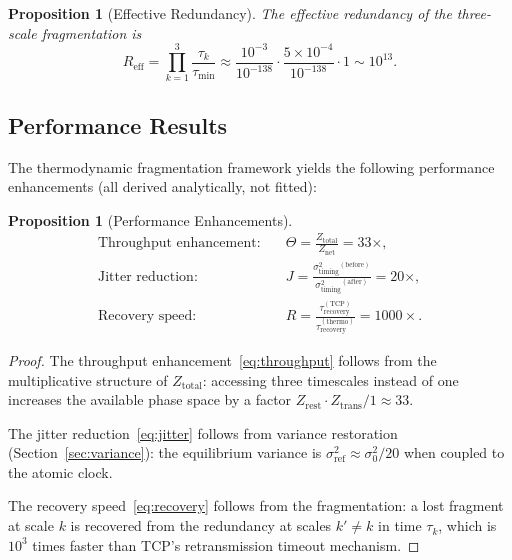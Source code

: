 \documentclass[11pt,twocolumn,a4paper]{article}
\newtheorem{proposition}[theorem]{Proposition}
\theoremstyle{definition}
\theoremstyle{remark}
\newcommand{\sigtime}{\sigma^{2}_{\mathrm{timing}}}
\begin{document}
\begin{proposition}[Effective Redundancy]\label{prop:redundancy}
The effective redundancy of the three-scale fragmentation is
\begin{equation}\label{eq:redundancy}
  R_{\mathrm{eff}} = \prod_{k=1}^{3}\frac{\tau_k}{\tau_{\min}}
  \approx \frac{10^{-3}}{10^{-138}}\cdot\frac{5\times 10^{-4}}{10^{-138}}
  \cdot 1 \sim 10^{13}.
\end{equation}
\end{proposition}

\subsection{Performance Results}\label{sec:frag_performance}

The thermodynamic fragmentation framework yields the following performance
enhancements (all derived analytically, not fitted):

\begin{proposition}[Performance Enhancements]\label{prop:performance}
\begin{align}
  \text{Throughput enhancement:}\quad &\Theta = \frac{Z_{\mathrm{total}}}{Z_{\mathrm{net}}} = 33\times, \label{eq:throughput}\\
  \text{Jitter reduction:}\quad &J = \frac{\sigtime^{(\mathrm{before})}}{\sigtime^{(\mathrm{after})}} = 20\times, \label{eq:jitter}\\
  \text{Recovery speed:}\quad &R = \frac{\tau_{\mathrm{recovery}}^{(\mathrm{TCP})}}{\tau_{\mathrm{recovery}}^{(\mathrm{thermo})}} = 1000\times. \label{eq:recovery}
\end{align}
\end{proposition}

\begin{proof}
The throughput enhancement~\eqref{eq:throughput} follows from the
multiplicative structure of $Z_{\mathrm{total}}$: accessing three
timescales instead of one increases the available phase space by a factor
$Z_{\mathrm{rest}}\cdot Z_{\mathrm{trans}}/1\approx 33$.

The jitter reduction~\eqref{eq:jitter} follows from variance restoration
(Section~\ref{sec:variance}): the equilibrium variance is
$\sigma^2_{\mathrm{ref}}\approx\sigma^2_0/20$ when coupled to the atomic
clock.

The recovery speed~\eqref{eq:recovery} follows from the fragmentation: a
lost fragment at scale $k$ is recovered from the redundancy at scales
$k'\neq k$ in time $\tau_k$, which is $10^3$ times faster than TCP's
retransmission timeout mechanism.
\end{proof}
\end{document}
